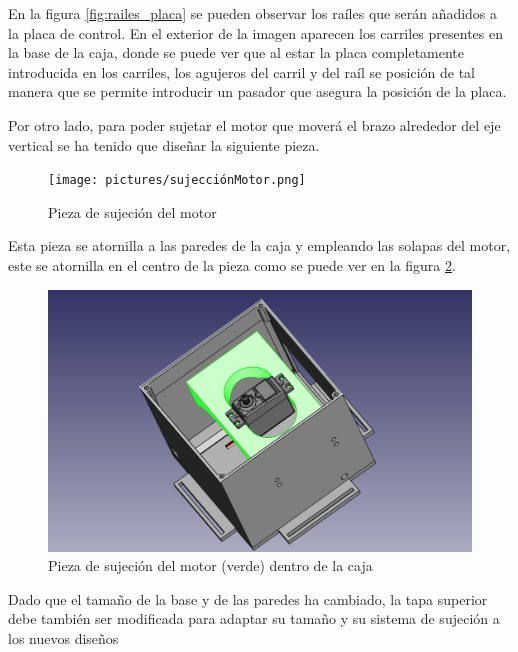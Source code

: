 En la figura \ref{fig:railes_placa} se pueden observar los raíles que serán añadidos a la placa de control. En el exterior de la imagen aparecen los carriles presentes en la base de la caja, donde se puede ver que al estar la placa completamente introducida en los carriles, los agujeros del carril y del raíl se posición de tal manera que se permite introducir un pasador que asegura la posición de la placa.

Por otro lado, para poder sujetar el motor que moverá el brazo alrededor del eje vertical se ha tenido que diseñar la siguiente pieza.

 \begin{figure}[H]
    \centering
    \texttt{[image: pictures/sujecciónMotor.png]}
    \caption{Pieza de sujeción del motor}
    \label{fig:sujecion_motor}
\end{figure}

Esta pieza se atornilla a las paredes de la caja y empleando las solapas del motor, este se atornilla en el centro de la pieza como se puede ver en la figura \ref{fig:pieza_sujecio_en_caja}.

 \begin{figure}[H]
    \centering
    \includegraphics[width=.9\linewidth]{pictures/cajaConMotor.png}
    \caption{Pieza de sujeción del motor (verde) dentro de la caja}
    \label{fig:pieza_sujecio_en_caja}
\end{figure}

Dado que el tamaño de la base y de las paredes ha cambiado, la tapa superior debe también ser modificada para adaptar su tamaño y su sistema de sujeción a los nuevos diseños

